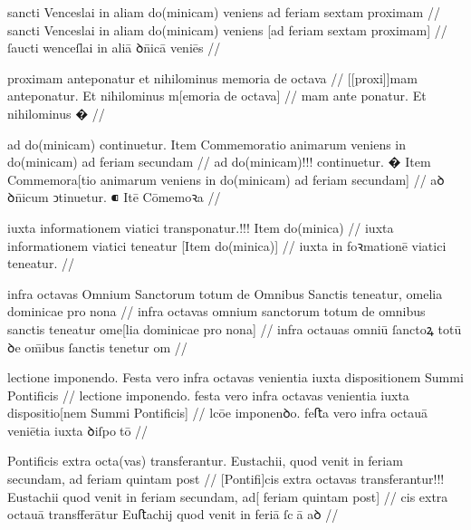 \ex \bg
\gla
{}
sancti Venceslai in aliam do(minicam) veniens ad feriam sextam proximam
//
\glRekonstrukcja
{}
sancti Venceslai in aliam do(minicam) veniens [ad feriam sextam proximam]
//
\glU
{}
ſaucti wenceſlai in aliā ꝺn̄icā veniēs    
//
\endgl
\xe



\ex \bg
\gla
{}
proximam anteponatur et nihilominus memoria de octava
//
\glRekonstrukcja
{}
[[proxi]]mam anteponatur. Et nihilominus m[emoria de octava]
//
\glU
{}
mam {ante ponatur}. Et nihilominus �  
//
\endgl
\xe



\ex \bg
\gla
{}
ad do(minicam) continuetur.
{} Item Commemoratio animarum veniens in do(minicam) ad feriam
secundam 
//
\glRekonstrukcja
{}
ad do(minicam)!!! continuetur.
� Item Commemora[tio animarum veniens in do(minicam) ad feriam
secundam] 
//
\glU
{}
aꝺ ꝺn̄icum ↄtinuetur. ⁌ Itē Cōmemoꝛa       
//
\endgl
\xe



\ex \bg
\gla
{}
iuxta informationem viatici transponatur.!!! {}
Item do(minica)
//
\glRekonstrukcja
{}
iuxta informationem viatici {} teneatur
[Item do(minica)]
//
\glU
{}
iuxta {in foꝛmationē} viatici {} teneatur.  
//
\endgl
\xe


\ex \bg
\gla
{}
infra octavas Omnium Sanctorum totum de Omnibus Sanctis teneatur, omelia dominicae pro nona
//
\glRekonstrukcja
{}
infra octavas omnium sanctorum totum de omnibus sanctis teneatur ome[lia dominicae pro nona]
//
\glU
{}
infra octauas omniū ſanctoꝝ totū ꝺe om̄ibus ſanctis tenetur om   
//
\endgl
\xe



\ex \bg
\gla
{}
lectione imponendo.
Festa vero infra octavas venientia iuxta dispositionem Summi
Pontificis
//
\glRekonstrukcja
{}
lectione imponendo.
festa vero infra octavas venientia iuxta dispositio[nem Summi
Pontificis]
//
\glU
{}
lcōe imponenꝺo. feﬅa vero infra octauā veniētia iuxta ꝺiſpotō  
//
\endgl
\xe



\ex \bg
\gla
{}
Pontificis extra octa(vas) transferantur.
Eustachii, quod venit in feriam secundam, ad feriam quintam
post 
//
\glRekonstrukcja
{}
[Pontifi]cis extra octavas transferantur!!!
Eustachii quod venit in feriam secundam, ad[ feriam quintam
post] 
//
\glU
{}
cis extra octauā transfferātur Euﬅachij quod venit in feriā ſcā aꝺ   
//
\endgl
\xe



